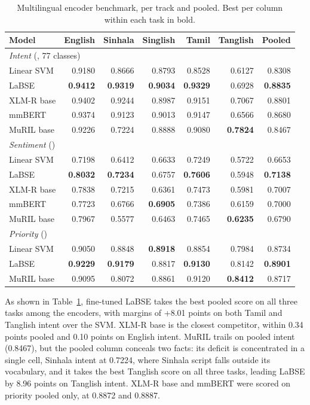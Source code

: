 \begin{table}[!htbp]
\caption{Multilingual encoder benchmark, per track and pooled. Best per column
within each task in bold.}
\label{tab:encoder_benchmark}
\centering
\scriptsize
\setlength{\tabcolsep}{3.2pt}
\begin{tabular}{@{}lrrrrrr@{}}
\toprule
Model & English & Sinhala & Singlish & Tamil & Tanglish & Pooled \\
\midrule
\multicolumn{7}{l}{\textit{Intent} (\macrof{}, 77 classes)} \\
Linear SVM & 0.9180 & 0.8666 & 0.8793 & 0.8528 & 0.6127 & 0.8308 \\
LaBSE      & \textbf{0.9412} & \textbf{0.9319} & \textbf{0.9034} & \textbf{0.9329} & 0.6928 & \textbf{0.8835} \\
XLM-R base & 0.9402 & 0.9244 & 0.8987 & 0.9151 & 0.7067 & 0.8801 \\
mmBERT     & 0.9374 & 0.9123 & 0.9013 & 0.9147 & 0.6566 & 0.8680 \\
MuRIL base & 0.9226 & 0.7224 & 0.8888 & 0.9080 & \textbf{0.7824} & 0.8467 \\
\midrule
\multicolumn{7}{l}{\textit{Sentiment} (\negf{})} \\
Linear SVM & 0.7198 & 0.6412 & 0.6633 & 0.7249 & 0.5722 & 0.6653 \\
LaBSE      & \textbf{0.8032} & \textbf{0.7234} & 0.6757 & \textbf{0.7606} & 0.5948 & \textbf{0.7138} \\
XLM-R base & 0.7838 & 0.7215 & 0.6361 & 0.7473 & 0.5981 & 0.7007 \\
mmBERT     & 0.7723 & 0.6766 & \textbf{0.6905} & 0.7386 & 0.6159 & 0.7000 \\
MuRIL base & 0.7967 & 0.5577 & 0.6463 & 0.7465 & \textbf{0.6235} & 0.6790 \\
\midrule
\multicolumn{7}{l}{\textit{Priority} (\macrof{})} \\
Linear SVM & 0.9050 & 0.8848 & \textbf{0.8918} & 0.8854 & 0.7984 & 0.8734 \\
LaBSE      & \textbf{0.9229} & \textbf{0.9179} & 0.8817 & \textbf{0.9130} & 0.8142 & \textbf{0.8901} \\
MuRIL base & 0.9095 & 0.8072 & 0.8861 & 0.9120 & \textbf{0.8412} & 0.8717 \\
\bottomrule
\end{tabular}
\end{table}
As shown in Table~\ref{tab:encoder_benchmark}, fine-tuned LaBSE takes the best pooled score on all three tasks among the encoders, with margins of +8.01 points on both Tamil and Tanglish intent over the SVM. XLM-R base is the closest competitor, within 0.34 points pooled and 0.10 points on English intent. MuRIL trails on pooled intent (0.8467), but the pooled column conceals two facts: its deficit is concentrated in a single cell, Sinhala intent at 0.7224, where Sinhala script falls outside its vocabulary, and it takes the best Tanglish score on all three tasks, leading LaBSE by 8.96 points on Tanglish intent. XLM-R base and mmBERT were scored on priority pooled only, at 0.8872 and 0.8887. 

